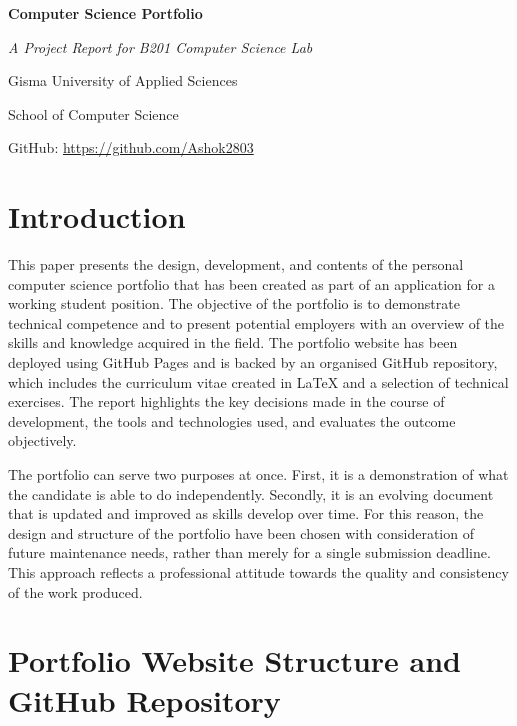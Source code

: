 \documentclass[12pt,a4paper]{article}
\begin{document}
\begin{titlepage}
  \centering
  \vspace*{3.5cm}
  {\LARGE\bfseries Computer Science Portfolio\par}
  \vspace{0.6cm}
  {\large\itshape A Project Report for B201 Computer Science Lab\par}
  \vspace{0.5cm}
  {\normalsize Gisma University of Applied Sciences\par}
  {\normalsize School of Computer Science\par}
  \vspace{0.5cm}
  {\normalsize GitHub: \url{https://github.com/Ashok2803}\par}
  \vfill
\end{titlepage}

\section{Introduction}

This paper presents the design, development, and contents of the personal computer science portfolio that has been created as part of an application for a working student position. The objective of the portfolio is to demonstrate technical competence and to present potential employers with an overview of the skills and knowledge acquired in the field. The portfolio website has been deployed using GitHub Pages and is backed by an organised GitHub repository, which includes the curriculum vitae created in \LaTeX{} and a selection of technical exercises. The report highlights the key decisions made in the course of development, the tools and technologies used, and evaluates the outcome objectively.

The portfolio can serve two purposes at once. First, it is a demonstration of what the candidate is able to do independently. Secondly, it is an evolving document that is updated and improved as skills develop over time. For this reason, the design and structure of the portfolio have been chosen with consideration of future maintenance needs, rather than merely for a single submission deadline. This approach reflects a professional attitude towards the quality and consistency of the work produced.

\section{Portfolio Website Structure and GitHub Repository}
\end{document}
